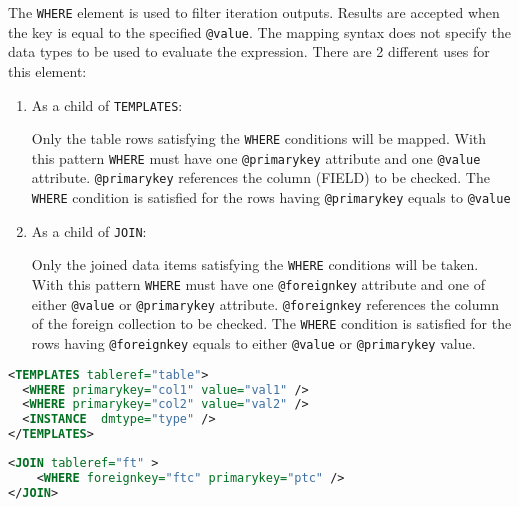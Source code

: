 The \texttt{WHERE} element is used to filter iteration outputs. Results are accepted when the key is equal to the specified \texttt{@value}. The mapping syntax does not specify the data types to be used to evaluate the expression. 
There  are 2 different uses for this element:
\begin{enumerate}
\item{As a child of \texttt{TEMPLATES}:}

  Only the table rows satisfying the \texttt{WHERE} conditions will be mapped. 
  With this pattern \texttt{WHERE} must have one \texttt{@primarykey} attribute and one \texttt{@value} attribute. 
  \texttt{@primarykey} references the column (FIELD) to be checked. 
  The \texttt{WHERE} condition is satisfied for the rows having \texttt{@primarykey} equals to \texttt{@value}
             
\item{As a child of \texttt{JOIN}:}
      
  Only the joined data items satisfying the \texttt{WHERE} conditions will be taken. 
  With this pattern \texttt{WHERE} must have one \texttt{@foreignkey} attribute and one of either \texttt{@value} or \texttt{@primarykey} attribute. 
  \texttt{@foreignkey} references the column of the foreign collection to be checked. 
  The \texttt{WHERE} condition is satisfied for the rows having \texttt{@foreignkey} equals to either \texttt{@value} or \texttt{@primarykey} value.

\end{enumerate}

\begin{lstlisting}[caption={\texttt{WHERE} Example: only rows having val1 as col1 value and  val2 as col2 value are mapped},language=XML]
<TEMPLATES tableref="table">
  <WHERE primarykey="col1" value="val1" />
  <WHERE primarykey="col2" value="val2" />
  <INSTANCE  dmtype="type" />
</TEMPLATES>
\end{lstlisting}

\begin{lstlisting}[caption={\texttt{WHERE} Example: the join is satisfied when the value of the ptc column  is equals to the ftc column of the foreign table },language=XML]
<JOIN tableref="ft" >
	<WHERE foreignkey="ftc" primarykey="ptc" />
</JOIN>
\end{lstlisting}

